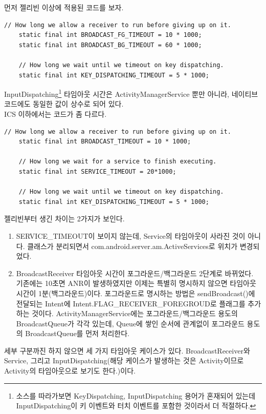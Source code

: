 먼저 젤리빈 이상에 적용된 코드를 보자.
\begin{lstlisting}[frame=single] 
	// How long we allow a receiver to run before giving up on it.
	static final int BROADCAST_FG_TIMEOUT = 10 * 1000;
	static final int BROADCAST_BG_TIMEOUT = 60 * 1000;

	// How long we wait until we timeout on key dispatching.
	static final int KEY_DISPATCHING_TIMEOUT = 5 * 1000;
\end{lstlisting}
InputDispatching\footnote{소스를 따라가보면 KeyDispatching, InputDispatching 용어가 혼재되어 있는데 InputDispatching이 키 이벤트와 터치 이벤트를 포함한 것이라서 더 적절하다.} 타임아웃 시간은 ActivityManagerService 뿐만 아니라, 네이티브 코드에도 동일한 값이 상수로 되어 있다.\\

ICS 이하에서는 코드가 좀 다르다.
\begin{lstlisting}[frame=single] 
	// How long we allow a receiver to run before giving up on it.
	static final int BROADCAST_TIMEOUT = 10 * 1000;

	// How long we wait for a service to finish executing.
	static final int SERVICE_TIMEOUT = 20*1000;

	// How long we wait until we timeout on key dispatching.
	static final int KEY_DISPATCHING_TIMEOUT = 5 * 1000;
\end{lstlisting}

젤리빈부터 생긴 차이는 2가지가 보인다.
\begin{enumerate}
\item  SERVICE\_TIMEOUT이 보이지 않는데, Service의 타임아웃이 사라진 것이 아니다. 클래스가 분리되면서 com.android.server.am.ActiveServices로 위치가 변경되었다.
\item BroadcastReceiver 타임아웃 시간이 포그라운드/백그라운드 2단계로 바뀌었다. 기존에는 10초면 ANR이 발생하였지만 이제는 특별히 명시하지 않으면 타임아웃 시간이 1분(백그라운드)이다. 포그라운드로 명시하는 방법은 sendBroadcast()에 전달되는 Intent에 Intent.FLAG\_RECEIVER\_FOREGROUD로 플래그를 추가하는 것이다.
ActivityManagerService에는 포그라운드/백그라운드 용도의 BroadcastQueue가 각각 있는데, Queue에 쌓인 순서에 관계없이 포그라운드 용도의 BroadcastQueue를 먼저 처리한다.
\end{enumerate}

세부 구분까진 하지 않으면 세 가지 타임아웃 케이스가 있다. BroadcastReceiver와 Service, 그리고  InputDispatching(해당 케이스가 발생하는 것은 Activity이므로 Activity의 타임아웃으로 보기도 한다.)이다.\\

